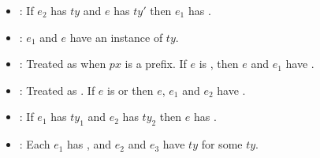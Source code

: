 \documentclass[11pt]{article}
\begin{document}
\begin{description}
        \begin{itemize}\vspace*{-2mm}

          \item {}:
              	If $e_2$ has $ty$ and $e$ has $ty'$ then $e_1$ has
		.


          \item {}: $e_1$ and $e$ have an instance of $ty$.

          \item {}: Treated as  when $px$ is a
                prefix.  If $e$ is , then $e$ and $e_1$ have
                .


          \item {}: Treated as
                .
                If $e$ is  or
		 then $e$, $e_1$ and $e_2$ have
		.

          \item {}: If $e_1$ has $ty_1$ and $e_2$ has $ty_2$ then
		$e$ has .






          \item {}:
    	        Each $e_{1}$ has , and $e_{2}$ and $e_{3}$
	        have $ty$ for some $ty$.


\end{itemize}
\end{description}
\end{document}
